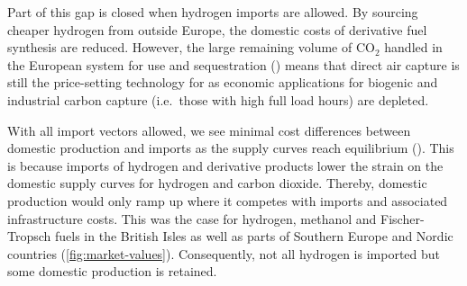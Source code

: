 
Part of this gap is closed when hydrogen imports are allowed. By sourcing
cheaper hydrogen from outside Europe, the domestic costs of derivative fuel
synthesis are reduced. However, the large remaining volume of CO$_2$ handled in
the European system for use and sequestration ()
means that direct air capture is still the price-setting technology for 
as economic applications for biogenic and industrial carbon capture (i.e.~those
with high full load hours) are depleted.


With all import vectors allowed, we see minimal cost differences between
domestic production and imports as the supply curves reach equilibrium
(). This is because imports of hydrogen and
derivative products lower the strain on the domestic supply curves for hydrogen
and carbon dioxide. Thereby, domestic production would only ramp up where it
competes with imports and associated infrastructure costs. This was the case for
hydrogen, methanol and Fischer-Tropsch fuels in the British Isles as well as
parts of Southern Europe and Nordic countries (\cref{fig:market-values}).
Consequently, not all hydrogen is imported but some domestic production is
retained.

